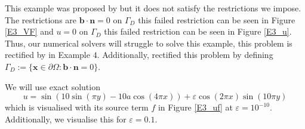 \documentclass[12pt]{ociamthesis}
\begin{document}
 This example was proposed by \cite{DN} but it does not satisfy the restrictions we impose. The restrictions are $\mathbf{b} \cdot \mathbf{n} = 0$ on $\Gamma_D$ this failed restriction can be seen in Figure \ref{E3_VF} and $u = 0$ on $\Gamma_D$ this failed restriction can be seen in Figure \ref{E3_u}. Thus, our numerical solvers will struggle to solve this example, this problem is rectified by in Example $4$. Additionally, \cite{DN} rectified this problem by defining $\Gamma_D := \{\mathbf{x} \in \partial \Omega :  \mathbf{b} \cdot \mathbf{n} = 0\}$.

We will use exact solution
\begin{equation}
u = \sin(10\sin(\pi y)-10a\cos(4 \pi x)) + \varepsilon \cos(2 \pi x)\sin(10 \pi y)
\end{equation}
which is visualised with its source term $f$ in Figure \ref{E3_uf} at $\varepsilon = 10^{-10}$. Additionally, we visualise this for $\varepsilon = 0.1$.
\end{document}
